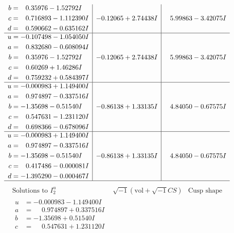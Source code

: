 \documentclass[1p]{elsarticle_modified}
\theoremstyle{definition}
\newcommand{\I}{\sqrt{-1}}
\begin{document}
$$\begin{array}{c|c|c}
\begin{aligned}
b &= \phantom{-}0.35976 - 1.52792 I \\
c &= \phantom{-}0.716893 - 1.112390 I \\
d &= \phantom{-}0.590662 - 0.635162 I\end{aligned}
 & -0.12065 + 2.74438 I & \phantom{-}5.99863 - 3.42075 I \\ \hline\begin{aligned}
u &= -0.107498 - 1.054050 I \\
a &= \phantom{-}0.832680 - 0.608094 I \\
b &= \phantom{-}0.35976 - 1.52792 I \\
c &= \phantom{-}0.60269 + 1.46286 I \\
d &= \phantom{-}0.759232 + 0.584397 I\end{aligned}
 & -0.12065 + 2.74438 I & \phantom{-}5.99863 - 3.42075 I \\ \hline\begin{aligned}
u &= -0.000983 + 1.149400 I \\
a &= \phantom{-}0.974897 - 0.337516 I \\
b &= -1.35698 - 0.51540 I \\
c &= \phantom{-}0.547631 - 1.231120 I \\
d &= \phantom{-}0.698366 - 0.678096 I\end{aligned}
 & -0.86138 + 1.33135 I & \phantom{-}4.84050 - 0.67575 I \\ \hline\begin{aligned}
u &= -0.000983 + 1.149400 I \\
a &= \phantom{-}0.974897 - 0.337516 I \\
b &= -1.35698 - 0.51540 I \\
c &= \phantom{-}0.417486 - 0.000081 I \\
d &= -1.395290 - 0.000467 I\end{aligned}
 & -0.86138 + 1.33135 I & \phantom{-}4.84050 - 0.67575 I\\
 \hline 
 \end{array}$$\newpage$$\begin{array}{c|c|c}  
\text{Solutions to }I^u_{2}& \I (\text{vol} + \sqrt{-1}CS) & \text{Cusp shape}\\
 \hline 
\begin{aligned}
u &= -0.000983 - 1.149400 I \\
a &= \phantom{-}0.974897 + 0.337516 I \\
b &= -1.35698 + 0.51540 I \\
c &= \phantom{-}0.547631 + 1.231120 I \\

\end{aligned}
\end{array}$$
\end{document}
